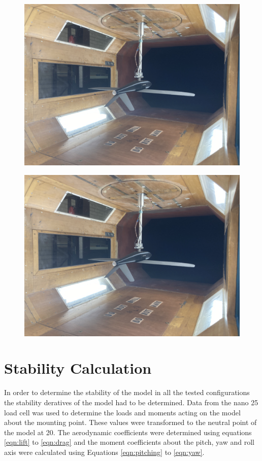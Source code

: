\begin{figure}
    \centering
    \includegraphics[]{04_Methodology/Figs/noprop}
    \label{fig:pusher}
\end{figure}


\begin{figure}
    \centering
    \includegraphics[]{04_Methodology/Figs/noprop}
    \label{fig:tractors}
\end{figure}



\section{Stability Calculation}
In order to determine the stability of the model in all the tested configurations the stability deratives of the model had to be determined. Data from the nano 25 load cell was used to determine the loads and moments acting on the model about the mounting point. These values were transformed  to the neutral point of the model at 20. The aerodynamic coefficients were determined using equations \ref{eqn:lift} to \ref{eqn:drag} and the moment coefficients about the pitch, yaw and roll axis were calculated using Equations \ref{eqn:pitching} to \ref{eqn:yaw}. 






